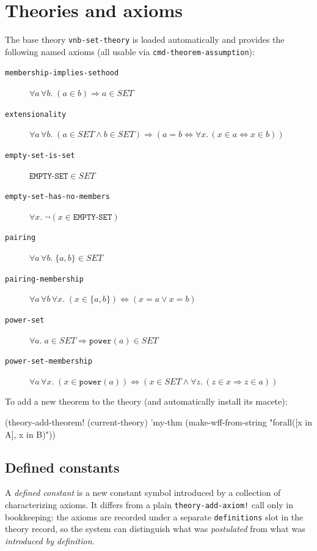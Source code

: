 \documentclass{amsbook}[openany]
\theoremstyle{definition}
\theoremstyle{remark}
\theoremstyle{remark}
\begin{document}
\section{Theories and axioms}
\label{sec:axioms}

The base theory \texttt{vnb-set-theory} is loaded automatically and
provides the following named axioms (all usable via
\texttt{cmd-theorem-assumption}):

\begin{description}
\item[\texttt{membership-implies-sethood}]
  $\forall a\,\forall b.\;(a \in b) \Rightarrow a \in \mathit{SET}$
\item[\texttt{extensionality}]
  $\forall a\,\forall b.\;(a \in \mathit{SET} \land b \in \mathit{SET}) \Rightarrow
  (a = b \Leftrightarrow \forall x.\,(x \in a \Leftrightarrow x \in b))$
\item[\texttt{empty-set-is-set}]
  $\texttt{EMPTY-SET} \in \mathit{SET}$
\item[\texttt{empty-set-has-no-members}]
  $\forall x.\;\lnot(x \in \texttt{EMPTY-SET})$
\item[\texttt{pairing}]
  $\forall a\,\forall b.\;\{a,b\} \in \mathit{SET}$
\item[\texttt{pairing-membership}]
  $\forall a\,\forall b\,\forall x.\;(x \in \{a,b\}) \Leftrightarrow (x=a \lor x=b)$
\item[\texttt{power-set}]
  $\forall a.\;a \in \mathit{SET} \Rightarrow \texttt{power}(a) \in \mathit{SET}$
\item[\texttt{power-set-membership}]
  $\forall a\,\forall x.\;(x \in \texttt{power}(a)) \Leftrightarrow
  (x \in \mathit{SET} \land \forall z.\,(z \in x \Rightarrow z \in a))$
\end{description}

To add a new theorem to the theory (and automatically install its macete):
\begin{VNBcode}
(theory-add-theorem! (current-theory) 'my-thm
  (make-wff-from-string "forall([x in A], x in B)"))
\end{VNBcode}

\subsection{Defined constants}
\label{sec:def-constant}

A \emph{defined constant} is a new constant symbol introduced by a
collection of characterizing axioms.  It differs from a plain
\texttt{theory-add-axiom!} call only in bookkeeping: the axioms are
recorded under a separate \texttt{definitions} slot in the theory record,
so the system can distinguish what was \emph{postulated} from what was
\emph{introduced by definition}.
\end{document}
